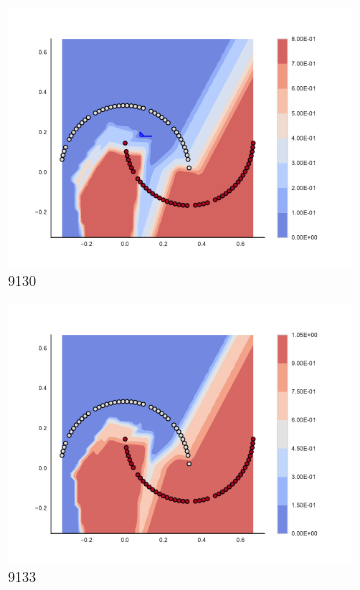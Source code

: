 \begin{figure}[h]
\begin{subfigure}[b]{0.09\textwidth}
    \includegraphics[clip, trim=2.35cm 1.75cm 4.5cm 0cm,width=\textwidth]{img/convergence/9130.pdf}
    \caption{9130}
    \label{fig:convergence_9130}
\end{subfigure}
%
\begin{subfigure}[b]{0.09\textwidth}
    \includegraphics[clip, trim=2.35cm 1.75cm 4.5cm 0cm,width=\textwidth]{img/convergence/9133.pdf}
    \caption{9133}
    \label{fig:convergence_9133}
\end{subfigure}
%
\begin{subfigure}[b]{0.09\textwidth}

\end{subfigure}
\end{figure}
